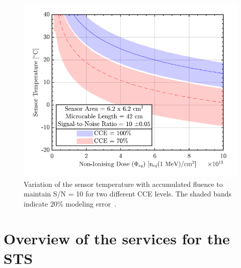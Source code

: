 \begin{figure}[!h]
\centering
\includegraphics[width=0.7\columnwidth]{Chapter2/images/SN.png}
\caption{Variation of the sensor temperature with accumulated fluence to maintain S/N = 10 for two different CCE levels. The shaded bands indicate 20\% modeling error~\cite{Agarwal}.}
\label{fig_cce_temp}
\end{figure}



\section{Overview of the services for the STS}

